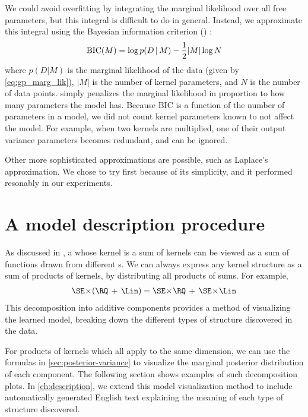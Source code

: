We could avoid overfitting by integrating the marginal likelihood over all free parameters, but this integral is difficult to do in general.
Instead, we approximate this integral using the Bayesian information criterion (\BIC{}) \citep{schwarz1978estimating}:
%
\begin{equation}
\textrm{BIC}(M) = \log p(D \,|\, M) - \frac{1}{2} |M| \log N
\end{equation}
%
where $p(D|M)$ is the marginal likelihood of the data (given by \cref{eq:gp_marg_lik}), $|M|$ is the number of kernel parameters, and $N$ is the number of data points.
\BIC{} simply penalizes the marginal likelihood in proportion to how many parameters the model has.
Because BIC is a function of the number of parameters in a model, we did not count kernel parameters known to not affect the model.
For example, when two kernels are multiplied, one of their output variance parameters becomes redundant, and can be ignored.

Other more sophisticated approximations are possible, such as Laplace's approximation.
We chose to try \BIC{} first because of its simplicity, and it performed resonably in our experiments.




\section{A model description procedure}

As discussed in , a \gp{} whose kernel is a sum of kernels can be viewed as a sum of functions drawn from different \gp{}s.
We can always express any kernel structure as a sum of products of kernels, by distributing all products of sums.
For example,
%
\begin{align}
\SE \kerntimes (\RQ \kernplus \Lin) = \SE \kerntimes  \RQ \kernplus \SE \kerntimes \Lin
\end{align}
%
This decomposition into additive components provides a method of visualizing the learned model, breaking down the different types of structure discovered in the data.

For products of kernels which all apply to the same dimension, we can use the formulas in \cref{sec:posterior-variance} to visualize the marginal posterior distribution of each component.
The following section shows examples of such decomposition plots.
In \cref{ch:description}, we extend this model visualization method to include automatically generated English text explaining the meaning of each type of structure discovered.



